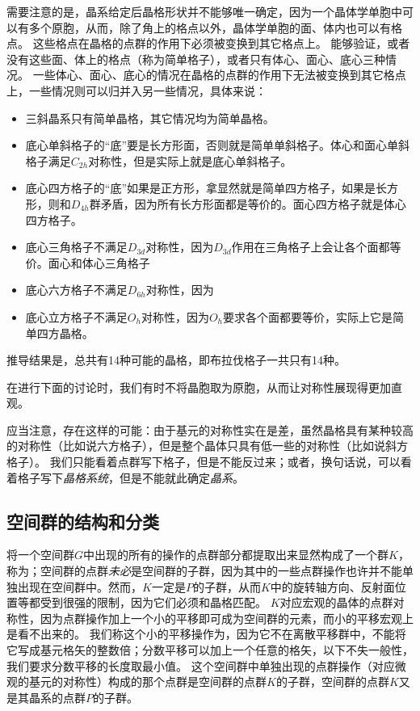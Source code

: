 需要注意的是，晶系给定后晶格形状并不能够唯一确定，因为一个晶体学单胞中可以有多个原胞，从而，除了角上的格点以外，晶体学单胞的面、体内也可以有格点。
这些格点在晶格的点群的作用下必须被变换到其它格点上。
能够验证，或者没有这些面、体上的格点（称为简单格子），或者只有体心、面心、底心三种情况。
一些体心、面心、底心的情况在晶格的点群的作用下无法被变换到其它格点上，一些情况则可以归并入另一些情况，具体来说：
\begin{itemize}
    \item 三斜晶系只有简单晶格，其它情况均为简单晶格。
    \item 底心单斜格子的“底”要是长方形面，否则就是简单单斜格子。体心和面心单斜格子满足$C_{2h}$对称性，但是实际上就是底心单斜格子。
    \item 底心四方格子的“底”如果是正方形，拿显然就是简单四方格子，如果是长方形，则和$D_{4h}$群矛盾，因为所有长方形面都是等价的。面心四方格子就是体心四方格子。
    \item 底心三角格子不满足$D_{3d}$对称性，因为$D_{3d}$作用在三角格子上会让各个面都等价。面心和体心三角格子%
    \item 底心六方格子不满足$D_{6h}$对称性，因为%
    \item 底心立方格子不满足$O_h$对称性，因为$O_h$要求各个面都要等价，实际上它是简单四方晶格。
\end{itemize}
推导结果是，总共有14种可能的晶格，即布拉伐格子一共只有14种。

在进行下面的讨论时，我们有时不将晶胞取为原胞，从而让对称性展现得更加直观。

应当注意，存在这样的可能：由于基元的对称性实在是差，虽然晶格具有某种较高的对称性（比如说六方格子），但是整个晶体只具有低一些的对称性（比如说斜方格子）。
我们只能看着点群写下格子，但是不能反过来；或者，换句话说，可以看着格子写下\emph{晶格系统}，但是不能就此确定\emph{晶系}。

\subsection{空间群的结构和分类}\label{sec:space-group-structure-classification}

将一个空间群$G$中出现的所有的操作的点群部分都提取出来显然构成了一个群$K$，称为；空间群的点群\emph{未必}是空间群的子群，因为其中的一些点群操作也许并不能单独出现在空间群中。然而，$K$一定是$P$的子群，从而$K$中的旋转轴方向、反射面位置等都受到很强的限制，因为它们必须和晶格匹配。
$K$对应宏观的晶体的点群对称性，因为点群操作加上一个小的平移即可成为空间群的元素，而小的平移宏观上是看不出来的。
我们称这个小的平移操作为，因为它不在离散平移群中，不能将它写成基元格矢的整数倍；分数平移可以加上一个任意的格矢，以下不失一般性，我们要求分数平移的长度取最小值。
这个空间群中单独出现的点群操作（对应微观的基元的对称性）构成的那个点群是空间群的点群$K$的子群，空间群的点群$K$又是其晶系的点群$P$的子群。

